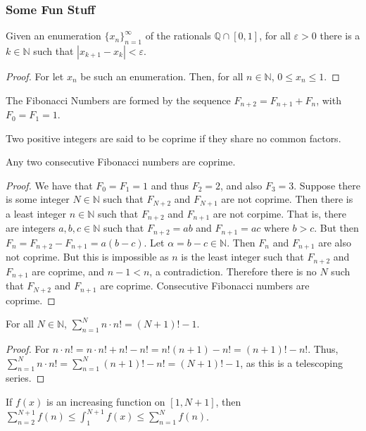 \documentclass[crop=false,class=book]{standalone}
\begin{document}
\subsubsection{Some Fun Stuff}
\begin{theorem}
Given an enumeration $\{x_n\}_{n=1}^{\infty}$ of the rationals $\mathbb{Q}\cap [0,1]$, for all $\varepsilon>0$ there is a $k\in \mathbb{N}$ such that $|x_{k+1}-x_k|<\varepsilon$.
\end{theorem}
\begin{proof}
For let $x_n$ be such an enumeration. Then, for all $n\in \mathbb{N}$, $0 \leq x_n \leq 1$.
\end{proof}
\begin{definition}
The Fibonacci Numbers are formed by the sequence $F_{n+2}=F_{n+1}+F_{n}$, with $F_0=F_1 = 1$.
\end{definition}
\begin{definition}
Two positive integers are said to be coprime if they share no common factors.
\end{definition}
\begin{theorem}
Any two consecutive Fibonacci numbers are coprime.
\end{theorem}
\begin{proof}
We have that $F_0=F_1 = 1$ and thus $F_2 = 2$, and also $F_3 = 3$. Suppose there is some integer $N\in \mathbb{N}$ such that $F_{N+2}$ and $F_{N+1}$ are not coprime. Then there is a least integer $n\in \mathbb{N}$ such that $F_{n+2}$ and $F_{n+1}$ are not corpime. That is, there are integers $a,b,c\in \mathbb{N}$ such that $F_{n+2} = ab$ and $F_{n+1} = ac$ where $b>c$. But then $F_{n} = F_{n+2} - F_{n+1} = a(b-c)$. Let $\alpha = b-c \in \mathbb{N}$. Then $F_n$ and $F_{n+1}$ are also not coprime. But this is impossible as $n$ is the least integer such that $F_{n+2}$ and $F_{n+1}$ are coprime, and $n-1<n$, a contradiction. Therefore there is no $N$ such that $F_{N+2}$ and $F_{n+1}$ are coprime. Consecutive Fibonacci numbers are coprime. 
\end{proof}
\begin{theorem}
For all $N\in \mathbb{N}$, $\sum_{n=1}^{N} n\cdot n! = (N+1)!-1$.
\end{theorem}
\begin{proof}
For $n\cdot n! = n\cdot n! + n! - n! = n!(n+1) - n!=(n+1)!-n!$. Thus, $\sum_{n=1}^{N} n\cdot n! = \sum_{n=1}^{N} (n+1)! -n! = (N+1)!-1$, as this is a telescoping series.
\end{proof}
\begin{theorem}
If $f(x)$ is an increasing function on $[1,N+1]$, then $\sum_{n=2}^{N+1} f(n) \leq \int_{1}^{N+1} f(x) \leq \sum_{n=1}^{N} f(n)$.
\end{theorem}
\end{document}

